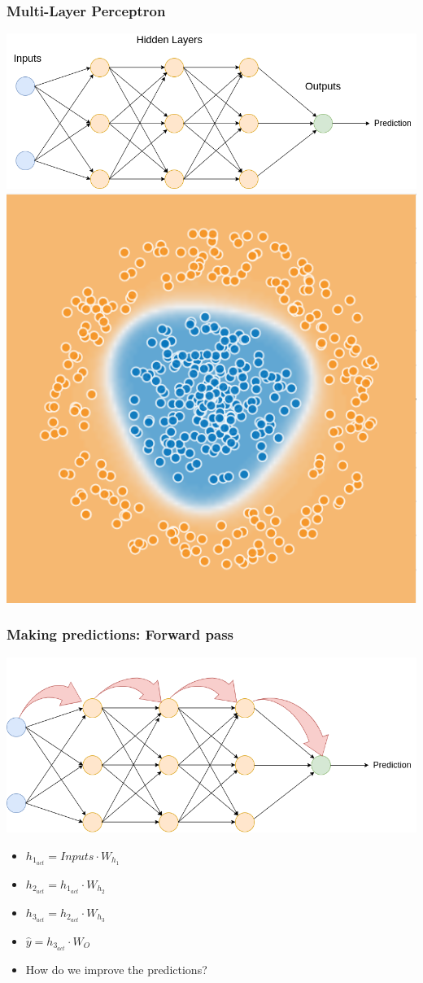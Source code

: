 \begin{frame}
    \frametitle{Multi-Layer Perceptron}
    \center\includegraphics[width=.8\textwidth]{Images/mlp.png}
    \center\includegraphics[width=.3\textwidth]{Images/circles_solved.png}
\end{frame}

\begin{frame}
    \frametitle{Making predictions: Forward pass}
    \center\includegraphics[width=.8\textwidth]{Images/forward_pass.png}
    \begin{itemize}
        \item $h_{1_{act}} = Inputs \cdot W_{h_1}$
        \item $h_{2_{act}} = h_{1_{act}} \cdot W_{h_2}$
        \item $h_{3_{act}} = h_{2_{act}} \cdot W_{h_3}$
        \item $\hat{y} = h_{3_{act}} \cdot W_{O}$
        \item How do we improve the predictions?
    \end{itemize}
\end{frame}

